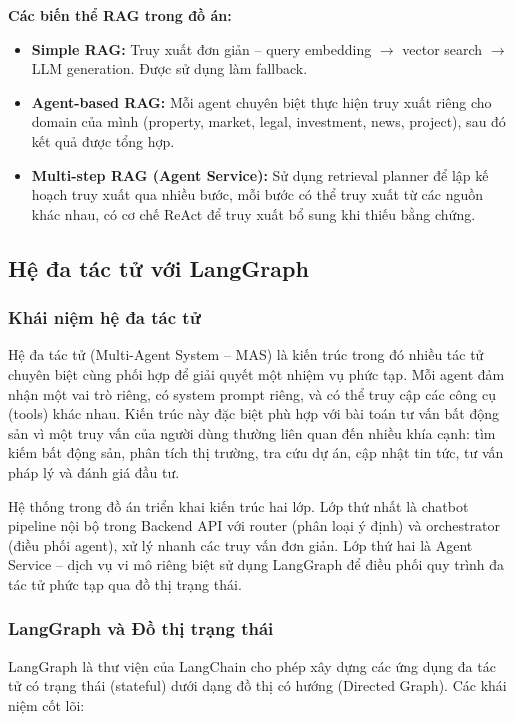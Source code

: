 \textbf{Các biến thể RAG trong đồ án:}

\begin{itemize}
    \item \textbf{Simple RAG:} Truy xuất đơn giản -- query embedding $\rightarrow$ vector search $\rightarrow$ LLM generation. Được sử dụng làm fallback.
    \item \textbf{Agent-based RAG:} Mỗi agent chuyên biệt thực hiện truy xuất riêng cho domain của mình (property, market, legal, investment, news, project), sau đó kết quả được tổng hợp.
    \item \textbf{Multi-step RAG (Agent Service):} Sử dụng retrieval planner để lập kế hoạch truy xuất qua nhiều bước, mỗi bước có thể truy xuất từ các nguồn khác nhau, có cơ chế ReAct để truy xuất bổ sung khi thiếu bằng chứng.
\end{itemize}

\subsection{Hệ đa tác tử với LangGraph}

\subsubsection*{Khái niệm hệ đa tác tử}

Hệ đa tác tử (Multi-Agent System -- MAS) là kiến trúc trong đó nhiều tác tử chuyên biệt cùng phối hợp để giải quyết một nhiệm vụ phức tạp. Mỗi agent đảm nhận một vai trò riêng, có system prompt riêng, và có thể truy cập các công cụ (tools) khác nhau. Kiến trúc này đặc biệt phù hợp với bài toán tư vấn bất động sản vì một truy vấn của người dùng thường liên quan đến nhiều khía cạnh: tìm kiếm bất động sản, phân tích thị trường, tra cứu dự án, cập nhật tin tức, tư vấn pháp lý và đánh giá đầu tư.

Hệ thống trong đồ án triển khai kiến trúc hai lớp. Lớp thứ nhất là chatbot pipeline nội bộ trong Backend API với router (phân loại ý định) và orchestrator (điều phối agent), xử lý nhanh các truy vấn đơn giản. Lớp thứ hai là Agent Service -- dịch vụ vi mô riêng biệt sử dụng LangGraph để điều phối quy trình đa tác tử phức tạp qua đồ thị trạng thái.

\subsubsection*{LangGraph và Đồ thị trạng thái}

LangGraph là thư viện của LangChain cho phép xây dựng các ứng dụng đa tác tử có trạng thái (stateful) dưới dạng đồ thị có hướng (Directed Graph). Các khái niệm cốt lõi:

